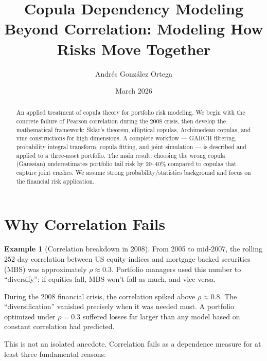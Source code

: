 \documentclass[11pt, a4paper]{article}
\title{%
    \textbf{Copula Dependency Modeling} \\[0.5em]
    \large Beyond Correlation: Modeling How Risks Move Together
}
\author{Andr\'es Gonz\'alez Ortega}
\date{March 2026}
\theoremstyle{definition}
\newtheorem{example}{Example}[section]
\theoremstyle{plain}
\theoremstyle{remark}
\begin{document}
\maketitle

\begin{abstract}
An applied treatment of copula theory for portfolio risk modeling.
We begin with the concrete failure of Pearson correlation during the 2008 crisis,
then develop the mathematical framework: Sklar's theorem, elliptical copulas, Archimedean copulas,
and vine constructions for high dimensions.
A complete workflow --- GARCH filtering, probability integral transform, copula fitting, and joint simulation ---
is described and applied to a three-asset portfolio.
The main result: choosing the wrong copula (Gaussian) underestimates portfolio tail risk
by 20--40\% compared to copulas that capture joint crashes.
We assume strong probability/statistics background and focus on the financial risk application.
\end{abstract}

\tableofcontents
\newpage

\section{Why Correlation Fails}
\label{sec:why-copulas}

\begin{example}[Correlation breakdown in 2008]\label{ex:corr-breakdown}
From 2005 to mid-2007, the rolling 252-day correlation between US equity indices
and mortgage-backed securities (MBS) was approximately $\rho \approx 0.3$.
Portfolio managers used this number to ``diversify'':
if equities fall, MBS won't fall as much, and vice versa.

During the 2008 financial crisis, the correlation spiked above $\rho \approx 0.8$.
The ``diversification'' vanished precisely when it was needed most.
A portfolio optimized under $\rho = 0.3$ suffered losses far larger than any
model based on constant correlation had predicted.
\end{example}

This is not an isolated anecdote.
Correlation fails as a dependence measure for at least three fundamental reasons:
\end{document}
